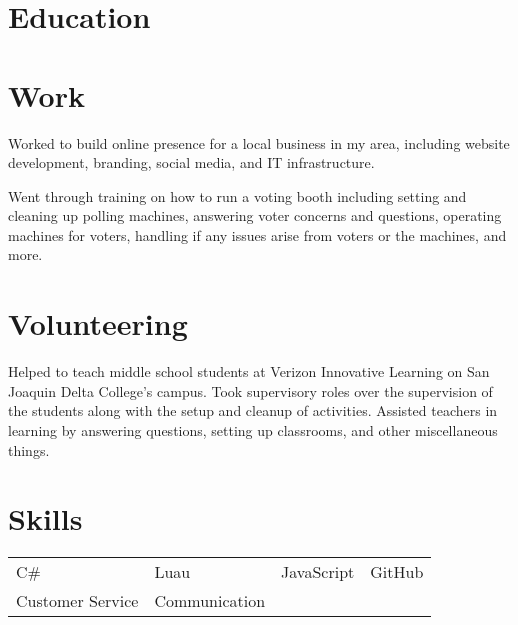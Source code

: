 \documentclass{my_cv}
\begin{document}

\section{Education}



\section{Work}

Worked to build online presence for a local business in my area, including website development, branding, social media, and IT infrastructure.

Went through training on how to run a voting booth including setting and cleaning up polling machines, answering voter concerns and questions, operating machines for voters, handling if any issues arise from voters or the machines, and more.

\section{Volunteering}

Helped to teach middle school students at Verizon Innovative Learning on San Joaquin Delta College's campus. Took supervisory roles over the supervision of the students along with the setup and cleanup of activities. Assisted teachers in learning by answering questions, setting up classrooms, and other miscellaneous things.

\section{Skills}
\begin{tabular}{l l l l}
C\# & Luau & JavaScript & GitHub \\
Customer Service & Communication
\end{tabular}
\end{document}
